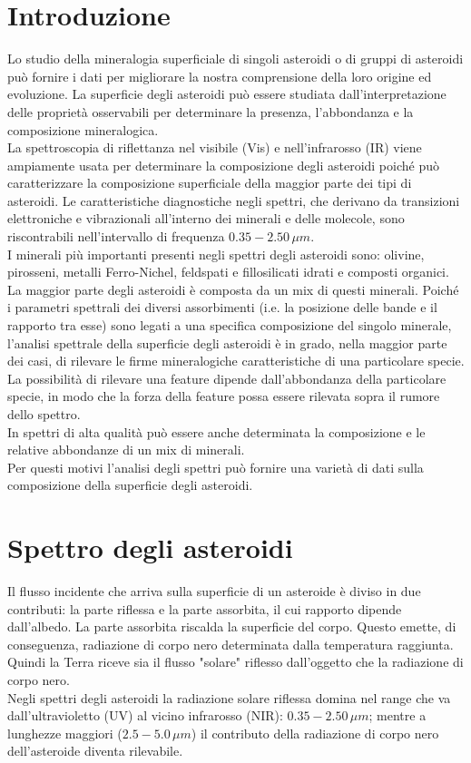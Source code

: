 \documentclass[a4paper,11pt,openright]{book}
\begin{document}
\section{Introduzione}
Lo studio della mineralogia superficiale di singoli asteroidi o di gruppi di asteroidi può fornire i dati per migliorare la nostra comprensione della loro origine ed evoluzione. La superficie degli asteroidi può essere studiata dall'interpretazione delle proprietà osservabili per determinare la presenza, l'abbondanza e la composizione mineralogica.\\
La spettroscopia di riflettanza nel visibile (Vis) e nell'infrarosso (IR) viene ampiamente usata per determinare la composizione degli asteroidi poiché può caratterizzare la composizione superficiale della maggior parte dei tipi di asteroidi. Le caratteristiche diagnostiche negli spettri, che derivano da transizioni elettroniche e vibrazionali all'interno dei minerali e delle molecole, sono riscontrabili nell'intervallo di frequenza $0.35-2.50\,\mu m$.\\
I minerali più importanti presenti negli spettri degli asteroidi sono: olivine, pirosseni, metalli Ferro-Nichel, feldspati e fillosilicati idrati e composti organici.\\
La maggior parte degli asteroidi è composta da un mix di questi minerali. Poiché i parametri spettrali dei diversi assorbimenti (i.e. la posizione delle bande e il rapporto tra esse) sono legati a una specifica composizione del singolo minerale, l'analisi spettrale della superficie degli asteroidi è in grado, nella maggior parte dei casi, di rilevare le firme mineralogiche caratteristiche di una particolare specie.\\
La possibilità di rilevare una feature dipende dall'abbondanza della particolare specie, in modo che la forza della feature possa essere rilevata sopra il rumore dello spettro.\\
In spettri di alta qualità può essere anche determinata la composizione e le relative abbondanze di un mix di minerali.\\
Per questi motivi l'analisi degli spettri può fornire una varietà di dati sulla composizione della superficie degli asteroidi.

\section{Spettro degli asteroidi}
Il flusso incidente che arriva sulla superficie di un asteroide è diviso in due contributi: la parte riflessa e la parte assorbita, il cui rapporto dipende dall'albedo. La parte assorbita riscalda la superficie del corpo. Questo emette, di conseguenza, radiazione di corpo nero determinata dalla temperatura raggiunta. Quindi la Terra riceve sia il flusso "solare" riflesso dall'oggetto che la radiazione di corpo nero.\\
Negli spettri degli asteroidi la radiazione solare riflessa domina nel range che va dall'ultravioletto (UV) al vicino infrarosso (NIR): $0.35-2.50\,\mu m$; mentre a lunghezze maggiori ($2.5-5.0\,\mu m$) il contributo della radiazione di corpo nero dell'asteroide diventa rilevabile.
\end{document}
